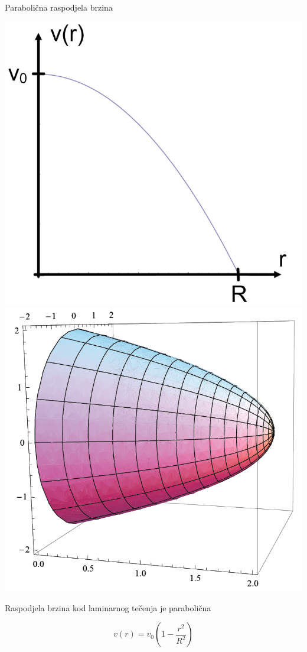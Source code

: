 \documentclass{beamer}
\begin{document}
\begin{frame}{Parabolična raspodjela brzina}

\begin{center}
\includegraphics[height=0.4\paperheight]{slike/parabola1.PNG}\qquad{}
\includegraphics[height=0.4\paperheight]{slike/parabola2.PNG}
\par\end{center}
\begin{alertblock}{Raspodjela brzina kod laminarnog tečenja je parabolična}

\[
v(r)=v_{0}\left(1-\frac{r^{2}}{R^{2}}\right)
\]
\end{alertblock}
\end{frame}
\end{document}
